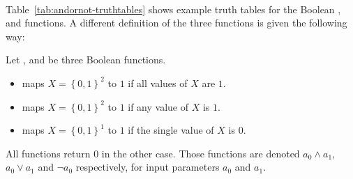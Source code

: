 \begin{table}[pt]
  \centering
  ~
  ~
  \caption{Truth tables for ,  and }
  \label{tab:andornot-truthtables}
\end{table}

Table~\ref{tab:andornot-truthtables} shows example truth tables for
the Boolean ,  and  functions.
A different definition of the three functions is given the following way:

\begin{defi}
  Let ,  and  be three Boolean functions.
  \begin{itemize}[noitemsep,topsep=0pt]
    \item
       maps $X = \left\{0,1\right\}^2$
      to $1$ if all values of $X$ are $1$.
    \item
       maps $X = \left\{0,1\right\}^2$
      to $1$ if any value of $X$ is $1$.
    \item
       maps $X = \left\{0,1\right\}^1$
      to $1$ if the single value of $X$ is $0$.
  \end{itemize}
  All functions return $0$ in the other case.
  Those functions are denoted $a_0 \land a_1$, $a_0 \lor a_1$
  and $\neg a_0$ respectively, for input parameters $a_0$ and $a_1$.
\end{defi}

